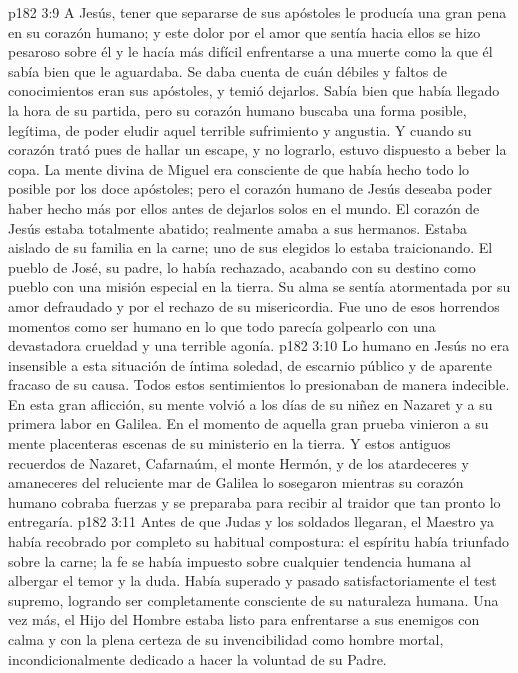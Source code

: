 \vs p182 3:9 \pc A Jesús, tener que separarse de sus apóstoles le producía una gran pena en su corazón humano; y este dolor por el amor que sentía hacia ellos se hizo pesaroso sobre él y le hacía más difícil enfrentarse a una muerte como la que él sabía bien que le aguardaba. Se daba cuenta de cuán débiles y faltos de conocimientos eran sus apóstoles, y temió dejarlos. Sabía bien que había llegado la hora de su partida, pero su corazón humano buscaba una forma posible, legítima, de poder eludir aquel terrible sufrimiento y angustia. Y cuando su corazón trató pues de hallar un escape, y no lograrlo, estuvo dispuesto a beber la copa. La mente divina de Miguel era consciente de que había hecho todo lo posible por los doce apóstoles; pero el corazón humano de Jesús deseaba poder haber hecho más por ellos antes de dejarlos solos en el mundo. El corazón de Jesús estaba totalmente abatido; realmente amaba a sus hermanos. Estaba aislado de su familia en la carne; uno de sus elegidos lo estaba traicionando. El pueblo de José, su padre, lo había rechazado, acabando con su destino como pueblo con una misión especial en la tierra. Su alma se sentía atormentada por su amor defraudado y por el rechazo de su misericordia. Fue uno de esos horrendos momentos como ser humano en lo que todo parecía golpearlo con una devastadora crueldad y una terrible agonía.
\vs p182 3:10 Lo humano en Jesús no era insensible a esta situación de íntima soledad, de escarnio público y de aparente fracaso de su causa. Todos estos sentimientos lo presionaban de manera indecible. En esta gran aflicción, su mente volvió a los días de su niñez en Nazaret y a su primera labor en Galilea. En el momento de aquella gran prueba vinieron a su mente placenteras escenas de su ministerio en la tierra. Y estos antiguos recuerdos de Nazaret, Cafarnaúm, el monte Hermón, y de los atardeceres y amaneceres del reluciente mar de Galilea lo sosegaron mientras su corazón humano cobraba fuerzas y se preparaba para recibir al traidor que tan pronto lo entregaría.
\vs p182 3:11 Antes de que Judas y los soldados llegaran, el Maestro ya había recobrado por completo su habitual compostura: el espíritu había triunfado sobre la carne; la fe se había impuesto sobre cualquier tendencia humana al albergar el temor y la duda. Había superado y pasado satisfactoriamente el test supremo, logrando ser completamente consciente de su naturaleza humana. Una vez más, el Hijo del Hombre estaba listo para enfrentarse a sus enemigos con calma y con la plena certeza de su invencibilidad como hombre mortal, incondicionalmente dedicado a hacer la voluntad de su Padre.
